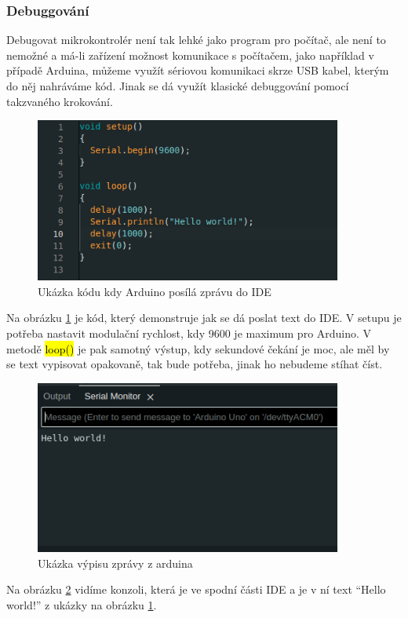 \subsubsection{Debuggování}
Debugovat mikrokontrolér není tak lehké jako program pro počítač, ale není to nemožné a má-li zařízení možnost komunikace s počítačem, jako například v případě Arduina, můžeme využít sériovou komunikaci skrze USB kabel, kterým do něj nahráváme kód. Jinak se dá využít klasické debuggování pomocí takzvaného krokování.
\begin{figure}[H]
	\centering
	\includegraphics[width=0.9\textwidth]{pictures/code.png}
    	\caption{Ukázka kódu kdy Arduino posílá zprávu do IDE}
   	\label{fig:usbIDE}
\end{figure}

Na obrázku \ref{fig:usbIDE} je kód, který demonstruje jak se dá poslat text do IDE. V setupu je potřeba nastavit modulační rychlost, kdy 9600 je maximum pro Arduino. V metodě \hl{loop()} je pak samotný výstup, kdy sekundové čekání je moc, ale měl by se text vypisovat opakovaně, tak bude potřeba, jinak ho nebudeme stíhat číst.

\begin{figure}[H]
	\centering
	\includegraphics[width=0.9\textwidth]{pictures/message.png}
    	\caption{Ukázka výpisu zprávy z arduina}
   	\label{fig:msgIDE}
\end{figure}
Na obrázku \ref{fig:msgIDE} vidíme konzoli, která je ve spodní části IDE a je v ní text “Hello world!” z ukázky na obrázku \ref{fig:usbIDE}.

